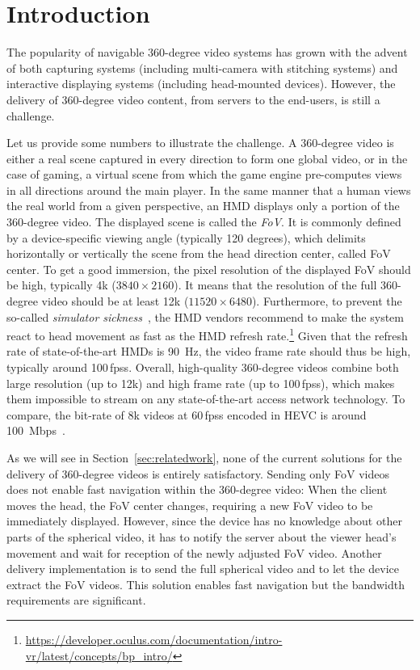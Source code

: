 \section{Introduction}
\label{sec:introduction}


The popularity of navigable 360-degree video systems
has grown with the advent of both capturing systems
(including multi-camera with stitching systems) and interactive displaying
systems (including head-mounted devices).
However, the delivery of 360-degree video content, from servers
to the end-users,
is still a challenge.

Let us provide some numbers to illustrate the challenge.
A 360-degree video is either a real scene captured in every direction
to form one global video, or in the case of gaming, a virtual scene from which the
game engine pre-computes views in all directions around the main player.
In the same manner that a human
views the real world from a given perspective, an \ac{HMD} displays only a portion
of the 360-degree video. The displayed scene is called the \textit{\ac{FoV}}. It is commonly
defined by 
a device-specific viewing angle (typically 120 degrees), which delimits horizontally or 
vertically the scene from the head direction center, called \ac{FoV} center. To get a good 
immersion, the pixel 
resolution of
the displayed \ac{FoV} should be high, typically 4k ($3840\times2160$). It means that
the resolution of the full 360-degree video should be at least 12k ($11520\times6480$). 
Furthermore, to prevent the so-called \emph{simulator sickness}~\cite{moss2011characteristics}, the \ac{HMD} 
vendors recommend to make the system react to head movement as fast as the \ac{HMD}
refresh rate.\footnote{\url{https://developer.oculus.com/documentation/intro-vr/latest/concepts/bp_intro/}} Given that the refresh rate of 
state-of-the-art \acp{HMD} is \SI{90}{Hz}, the video frame rate should thus be high,
typically around 100\,\acp{fps}.
Overall, high-quality 360-degree videos combine both large resolution (up to 12k) and high
frame rate (up to 100\,\acp{fps}), which makes them impossible to stream on any
state-of-the-art access network technology. To compare, the bit-rate of 8k videos 
at 60\,\acp{fps} encoded in \ac{HEVC} is around \SI{100}{Mbps}~\cite{7398367}.

As we will see in Section~\ref{sec:relatedwork}, none of the current solutions 
for the delivery of 360-degree videos is entirely
satisfactory. Sending only FoV videos does
not enable fast
navigation within the 360-degree video: When the client moves the head, the FoV 
center changes, requiring a new FoV video to be immediately displayed. However, since 
the device has no knowledge about other parts of the spherical video, it has to notify 
the server about the viewer head's movement and wait for reception of the newly 
adjusted FoV video.
Another delivery implementation is to send the full spherical video
and to let the device
extract the \ac{FoV} videos. This solution enables fast navigation but the bandwidth 
requirements are
significant.

